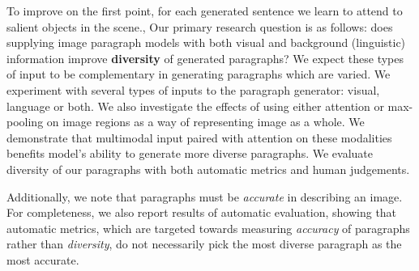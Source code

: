 \documentclass[11pt,a4paper]{article}
\begin{document}
To improve on the first point, for each generated sentence we learn to attend to salient objects in the scene.,
Our primary research question is as follows: does supplying image paragraph models with both visual and background (linguistic) information improve \textbf{diversity} of generated paragraphs?
We expect these types of input to be complementary in generating paragraphs which are varied.
We experiment with several types of inputs to the paragraph generator: visual, language or both.
We also investigate the effects of using either attention or max-pooling on image regions as a way of representing image as a whole.
We demonstrate that multimodal input paired with attention on these modalities benefits model's ability to generate more diverse paragraphs.
We evaluate diversity of our paragraphs with both automatic metrics and human judgements.

Additionally, we note that paragraphs must be \textit{accurate} in describing an image.
For completeness, we also report results of automatic evaluation, showing that automatic metrics, which are targeted towards measuring \textit{accuracy} of paragraphs rather than \textit{diversity}, do not necessarily pick the most diverse paragraph as the most accurate.
\end{document}
